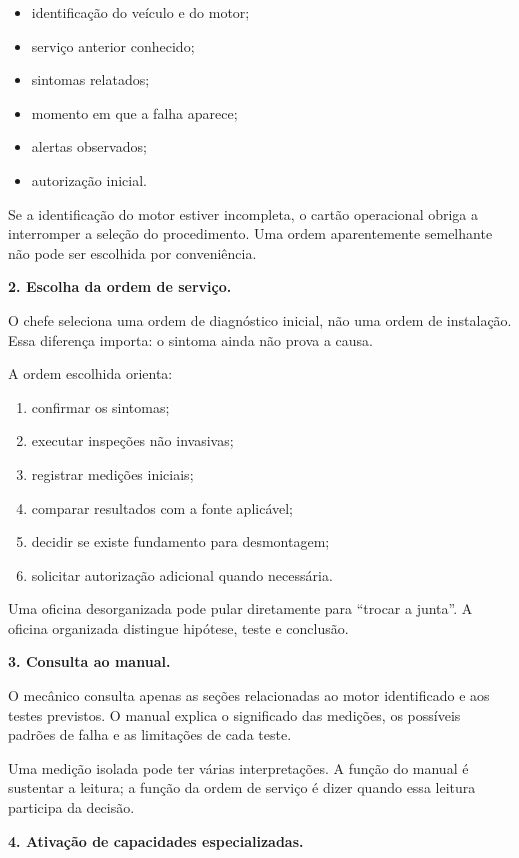 \documentclass[
  10pt,
  a4paper,
  oneside]{book}
\providecommand{\tightlist}{%
  \setlength{\itemsep}{0pt}\setlength{\parskip}{0pt}}
\begin{document}
\begin{itemize}
\tightlist
\item
  identificação do veículo e do motor;
\item
  serviço anterior conhecido;
\item
  sintomas relatados;
\item
  momento em que a falha aparece;
\item
  alertas observados;
\item
  autorização inicial.
\end{itemize}

Se a identificação do motor estiver incompleta, o cartão operacional
obriga a interromper a seleção do procedimento. Uma ordem aparentemente
semelhante não pode ser escolhida por conveniência.

\textbf{2. Escolha da ordem de serviço.}

O chefe seleciona uma ordem de diagnóstico inicial, não uma ordem de
instalação. Essa diferença importa: o sintoma ainda não prova a causa.

A ordem escolhida orienta:

\begin{enumerate}
\def\labelenumi{\arabic{enumi}.}
\tightlist
\item
  confirmar os sintomas;
\item
  executar inspeções não invasivas;
\item
  registrar medições iniciais;
\item
  comparar resultados com a fonte aplicável;
\item
  decidir se existe fundamento para desmontagem;
\item
  solicitar autorização adicional quando necessária.
\end{enumerate}

Uma oficina desorganizada pode pular diretamente para ``trocar a
junta''. A oficina organizada distingue hipótese, teste e conclusão.

\textbf{3. Consulta ao manual.}

O mecânico consulta apenas as seções relacionadas ao motor identificado
e aos testes previstos. O manual explica o significado das medições, os
possíveis padrões de falha e as limitações de cada teste.

Uma medição isolada pode ter várias interpretações. A função do manual é
sustentar a leitura; a função da ordem de serviço é dizer quando essa
leitura participa da decisão.

\textbf{4. Ativação de capacidades especializadas.}
\end{document}
